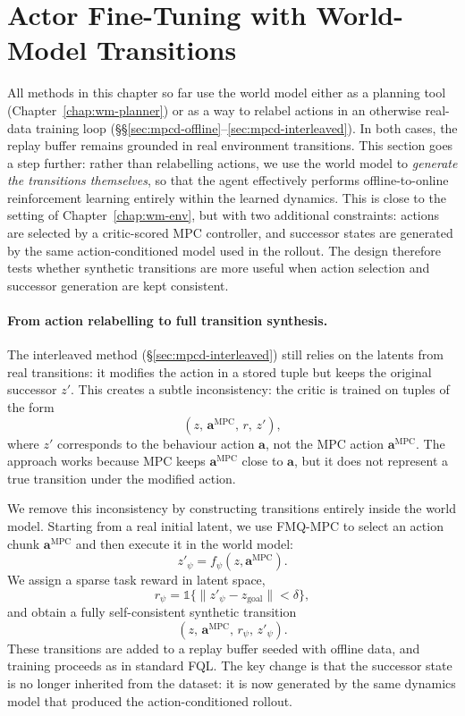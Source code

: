 \section{Actor Fine-Tuning with World-Model Transitions}
\label{sec:mpcd-online-wm}

All methods in this chapter so far use the world model either as a
planning tool (Chapter~\ref{chap:wm-planner}) or as a way to relabel
actions in an otherwise real-data training loop
(\S\S\ref{sec:mpcd-offline}--\ref{sec:mpcd-interleaved}). In both cases,
the replay buffer remains grounded in real environment transitions.
This section goes a step further: rather than relabelling actions, we
use the world model to \emph{generate the transitions themselves}, so
that the agent effectively performs offline-to-online reinforcement
learning entirely within the learned dynamics.
This is close to the setting of Chapter~\ref{chap:wm-env}, but with two
additional constraints: actions are selected by a critic-scored MPC
controller, and successor states are generated by the same
action-conditioned model used in the rollout. The design therefore tests
whether synthetic transitions are more useful when action selection and
successor generation are kept consistent.

\paragraph{From action relabelling to full transition synthesis.}
The interleaved method (\S\ref{sec:mpcd-interleaved}) still relies on
the latents from real transitions: it modifies the action in a stored tuple but keeps the
original successor $z'$. This creates a subtle inconsistency: the critic
is trained on tuples of the form
\[
(z,\, \mathbf{a}^{\text{MPC}},\, r,\, z'),
\]
where $z'$ corresponds to the behaviour action $\mathbf{a}$, not the
MPC action $\mathbf{a}^{\text{MPC}}$. The approach works because MPC
keeps $\mathbf{a}^{\text{MPC}}$ close to $\mathbf{a}$, but it does not
represent a true transition under the modified action.

We remove this inconsistency by constructing transitions entirely inside
the world model. Starting from a real initial latent, we use FMQ-MPC to
select an action chunk $\mathbf{a}^{\text{MPC}}$ and then execute it in
the world model:
\[
z'_\psi = f_\psi(z, \mathbf{a}^{\text{MPC}}).
\]
We assign a sparse task reward in latent space,
\[
r_\psi = \mathbb{1}\{\lVert z'_\psi - z_{\text{goal}}\rVert < \delta\},
\]
and obtain a fully self-consistent synthetic transition
\[
(z,\, \mathbf{a}^{\text{MPC}},\, r_\psi,\, z'_\psi).
\]
These transitions are added to a replay buffer seeded with offline data,
and training proceeds as in standard FQL.
The key change is that the successor state is no longer inherited from
the dataset: it is now generated by the same dynamics model that
produced the action-conditioned rollout.

